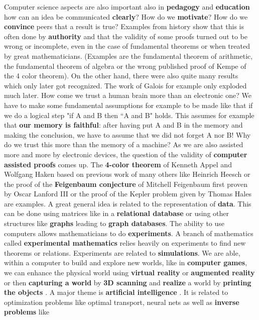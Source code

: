 \documentclass[12pt]{amsart}
\newcounter{example}    \def\example#1{ \item \fontsize{12}{15} \selectfont #1 \fontsize{12}{15} \selectfont }
\begin{document}
Computer science aspects are also important also in {\bf pedagogy} and {\bf education} 
how can an idea be communicated {\bf clearly}?
How do we {\bf motivate}? How do we {\bf convince} peers that a result is true? Examples from 
history show that this is often done by {\bf authority} and that the validity of some proofs turned
out to be wrong or incomplete, even in the case of fundamental theorems or when treated by 
great mathematicians. (Examples are the fundamental theorem of arithmetic, the fundamental theorem of
algebra or the wrong published proof of Kempe of the 4 color theorem). On the other hand, there were
also quite many results which only later got recognized. The work of Galois for example only exploded
much later. How come we trust a human brain more than an electronic one? We have to make
some fundamental assumptions for example to be made like that if we do a logical step "if A and B
then ``A and B" holds. This assumes for example that {\bf our memory is faithful}: after having put A and
B in the memory and making the conclusion, we have to assume that we did not forget A nor B! 
Why do we trust this more than the memory of a machine?
As we are also assisted more and more by electronic devices, the question of the validity of
{\bf computer assisted proofs} comes up. The {\bf 4-color theorem} of Kenneth Appel and Wolfgang 
Haken based on previous work of many others like Heinrich Heesch or the proof of the {\bf Feigenbaum
conjecture} of Mitchell Feigenbaum first proven by Oscar Lanford III 
or the proof of the Kepler problem given by Thomas Hales are examples. 
A great general idea is related to the representation of {\bf data}. This can be done using
matrices like in a {\bf relational database} or using other structures like {\bf graphs} leading
to {\bf graph databases}. The ability to use computers allows mathematicians to do {\bf experiments}. A branch
of mathematics called {\bf experimental mathematics} \cite{ArnoldExperimental,BBG}
relies heavily on experiments to find new
theorems or relations. Experiments are related to {\bf simulations}. We are able, within a computer to build
and explore new worlds, like in {\bf computer games}, we can enhance the physical world using {\bf virtual reality} or 
{\bf augmented reality} or then {\bf capturing a world} by {\bf 3D scanning} and 
{\bf realize} a world by {\bf printing the objects} \cite{CFZ}. 
A major theme is {\bf artificial intelligence} \cite{RussellNorvig,JacksonAI}. It is related to 
optimization problems like optimal transport, neural nets as well as {\bf inverse problems} like 
\end{document}
